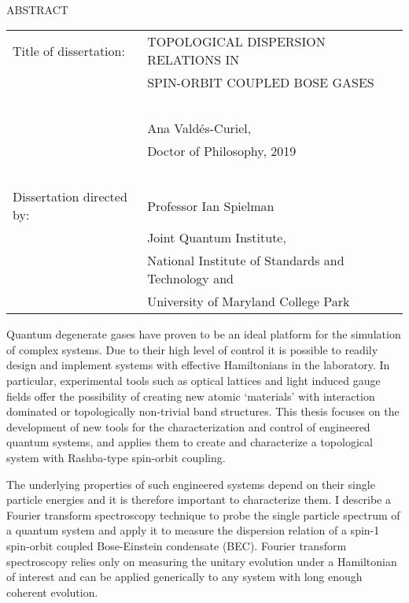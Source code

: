 
\hbox{\ }

\renewcommand{\baselinestretch}{1}
\small \normalsize

\begin{center}
\large{{ABSTRACT}} 

\vspace{3em} 

\end{center}
\hspace{-.15in}
\begin{tabular}{ll}
Title of dissertation:   
&				      {\large  TOPOLOGICAL DISPERSION RELATIONS IN } \\
&				      {\large  SPIN-ORBIT COUPLED BOSE GASES} \\
\ \\
&                     {\large  Ana Valdés-Curiel,} \\
&					  {\large  Doctor of Philosophy, 2019} \\
\ \\
Dissertation directed by: & {\large  Professor Ian Spielman} \\
&  							{\small	 Joint Quantum Institute,} \\
&  							{\small	 National Institute of Standards and Technology and} \\
&  							{\small	 University of Maryland College Park} \\
\end{tabular}

\vspace{3em}

\renewcommand{\baselinestretch}{2}
\large \normalsize

Quantum degenerate gases have proven to be an ideal platform for the  simulation of complex systems. Due to their high level of control it is possible to readily design and implement systems with effective Hamiltonians in the laboratory. In particular, experimental tools such as optical lattices and light induced gauge fields offer the possibility of creating new atomic `materials' with interaction dominated or topologically non-trivial band structures. This thesis focuses on the development of new tools for the characterization and control of engineered quantum systems, and applies them to create and characterize a topological system with Rashba-type spin-orbit coupling. 

The underlying properties of such engineered systems depend on their single particle energies and it is therefore important to characterize them. I describe a Fourier transform spectroscopy technique to probe the single particle spectrum of a quantum system and apply it to measure the dispersion relation of a spin-1 spin-orbit coupled Bose-Einstein condensate (BEC). Fourier transform spectroscopy relies only on measuring the unitary evolution under a Hamiltonian of interest and can be applied generically to any system with long enough coherent evolution.

